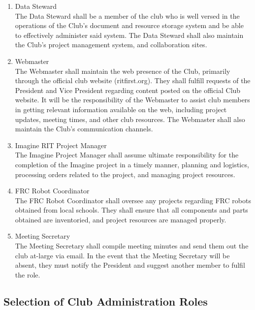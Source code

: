 \documentclass[english,11pt]{article}
\begin{document}
\begin{enumerate}[label=\Alph*.]
    \item {\large Data Steward} \\
            The Data Steward shall be a member of the club who is well versed in the operations of the Club's document and resource storage system and be able to effectively administer said system.
            The Data Steward shall also maintain the Club's project management system, and collaboration sites.
    \item {\large Webmaster} \\
            The Webmaster shall maintain the web presence of the Club, primarily through the official club website (ritfirst.org).
            They shall fulfill requests of the President and Vice President regarding content posted on the official Club website.
            It will be the responsibility of the Webmaster to assist club members in getting relevant information available on the web, including project updates, meeting times, and other club resources.
            The Webmaster shall also maintain the Club's communication channels.
    \item {\large Imagine RIT Project Manager} \\
            The Imagine Project Manager shall assume ultimate responsibility for the completion of the Imagine project in a timely manner, planning and logistics, processing orders related to the project, and managing project resources.
    \item {\large FRC Robot Coordinator} \\
            The FRC Robot Coordinator shall oversee any projects regarding FRC robots obtained from local schools.
            They shall ensure that all components and parts obtained are inventoried, and project resources are managed properly.
    \item {\large Meeting Secretary} \\
            The Meeting Secretary shall compile meeting minutes and send them out the club at-large via email.
            In the event that the Meeting Secretary will be absent, they must notify the President and suggest another member to fulfil the role.
\end{enumerate}

\subsection{Selection of Club Administration Roles} \label{sect:cadmin:selection}
\end{document}
